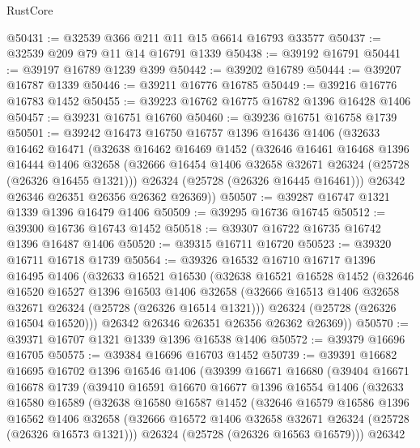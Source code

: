 \begin{lexlean}{RustCore}
\begin{coremodule}
@50431 := @32539 @366 @211 @11 @15 @6614 @16793 @33577
@50437 := @32539 @209 @79 @11 @14 @16791 @1339
@50438 := @39192 @16791
@50441 := @39197 @16789 @1239 @399
@50442 := @39202 @16789
@50444 := @39207 @16787 @1339
@50446 := @39211 @16776 @16785
@50449 := @39216 @16776 @16783 @1452
@50455 := @39223 @16762 @16775 @16782 @1396 @16428 @1406
@50457 := @39231 @16751 @16760
@50460 := @39236 @16751 @16758 @1739
@50501 := @39242
    @16473
    @16750
    @16757
    @1396
    @16436
    @1406
    (@32633
      @16462
      @16471
      (@32638
        @16462
        @16469
        @1452
        (@32646
          @16461
          @16468
          @1396
          @16444
          @1406
          @32658
          (@32666 @16454 @1406 @32658 @32671 @26324 (@25728 (@26326 @16455 @1321)))
          @26324
          (@25728 (@26326 @16445 @16461)))
        @26342
        @26346
        @26351
        @26356
        @26362
        @26369))
@50507 := @39287 @16747 @1321 @1339 @1396 @16479 @1406
@50509 := @39295 @16736 @16745
@50512 := @39300 @16736 @16743 @1452
@50518 := @39307 @16722 @16735 @16742 @1396 @16487 @1406
@50520 := @39315 @16711 @16720
@50523 := @39320 @16711 @16718 @1739
@50564 := @39326
    @16532
    @16710
    @16717
    @1396
    @16495
    @1406
    (@32633
      @16521
      @16530
      (@32638
        @16521
        @16528
        @1452
        (@32646
          @16520
          @16527
          @1396
          @16503
          @1406
          @32658
          (@32666 @16513 @1406 @32658 @32671 @26324 (@25728 (@26326 @16514 @1321)))
          @26324
          (@25728 (@26326 @16504 @16520)))
        @26342
        @26346
        @26351
        @26356
        @26362
        @26369))
@50570 := @39371 @16707 @1321 @1339 @1396 @16538 @1406
@50572 := @39379 @16696 @16705
@50575 := @39384 @16696 @16703 @1452
@50739 := @39391
    @16682
    @16695
    @16702
    @1396
    @16546
    @1406
    (@39399
      @16671
      @16680
      (@39404
        @16671
        @16678
        @1739
        (@39410
          @16591
          @16670
          @16677
          @1396
          @16554
          @1406
          (@32633
            @16580
            @16589
            (@32638
              @16580
              @16587
              @1452
              (@32646
                @16579
                @16586
                @1396
                @16562
                @1406
                @32658
                (@32666 @16572 @1406 @32658 @32671 @26324 (@25728 (@26326 @16573 @1321)))
                @26324
                (@25728 (@26326 @16563 @16579)))
              @26342

\end{coremodule}
\end{lexlean}

